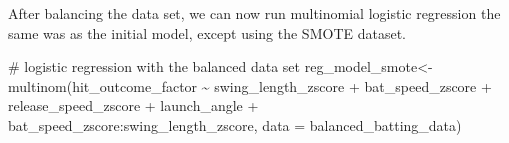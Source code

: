 \documentclass[
  letterpaper,
  DIV=11,
  numbers=noendperiod]{scrartcl}
\newenvironment{Shaded}{\begin{snugshade}}{\end{snugshade}}
\newcommand{\AttributeTok}[1]{\textcolor[rgb]{0.40,0.45,0.13}{#1}}
\newcommand{\CommentTok}[1]{\textcolor[rgb]{0.37,0.37,0.37}{#1}}
\newcommand{\FunctionTok}[1]{\textcolor[rgb]{0.28,0.35,0.67}{#1}}
\newcommand{\NormalTok}[1]{\textcolor[rgb]{0.00,0.23,0.31}{#1}}
\newcommand{\OtherTok}[1]{\textcolor[rgb]{0.00,0.23,0.31}{#1}}
\newcommand{\SpecialCharTok}[1]{\textcolor[rgb]{0.37,0.37,0.37}{#1}}
\begin{document}
After balancing the data set, we can now run multinomial logistic
regression the same was as the initial model, except using the SMOTE
dataset.

\begin{Shaded}
\begin{Highlighting}[]
\CommentTok{\# logistic regression with the balanced data set }
\NormalTok{reg\_model\_smote}\OtherTok{\textless{}{-}} \FunctionTok{multinom}\NormalTok{(hit\_outcome\_factor }\SpecialCharTok{\textasciitilde{}}
\NormalTok{                          swing\_length\_zscore }\SpecialCharTok{+}
\NormalTok{                          bat\_speed\_zscore }\SpecialCharTok{+}
\NormalTok{                          release\_speed\_zscore }\SpecialCharTok{+}
\NormalTok{                          launch\_angle }\SpecialCharTok{+}
\NormalTok{                          bat\_speed\_zscore}\SpecialCharTok{:}\NormalTok{swing\_length\_zscore,}
                        \AttributeTok{data =}\NormalTok{ balanced\_batting\_data)}
\end{Highlighting}
\end{Shaded}

\begin{table}

\caption{\label{tbl-reg-smote-output}Stage 1 Multinomial Logistic
Regression Output for SMOTE Model}


\end{table}%
\end{document}
